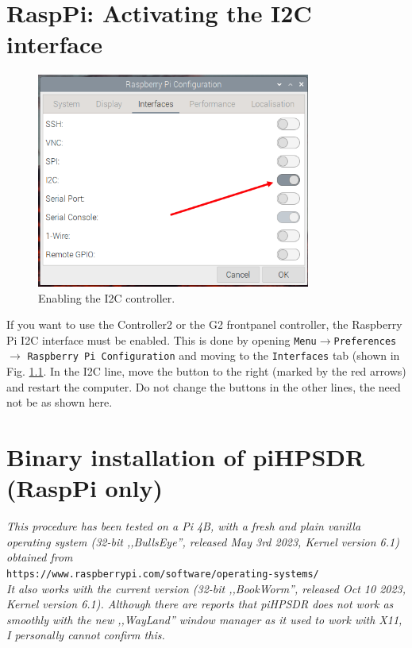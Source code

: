 \documentclass[12pt]{book}
\begin{document}
\chapter[RaspPi: Activating I2C]{RaspPi: Activating the I2C interface}
\label{sec:i2c}

\begin{figure}[ht]
\center
\includegraphics[width=9cm]{piEnableI2C.png}
\caption{Enabling the I2C controller.}
\label{fig:piEnableI2C}
\end{figure}

If you want to use the Controller2 or the G2 frontpanel controller, the Raspberry Pi I2C interface
must be enabled. This is done by opening \texttt{Menu}$\to$\texttt{Preferences}$\to$
\texttt{Raspberry Pi Configuration} and moving to the \texttt{Interfaces} tab
(shown in Fig. \ref{fig:piEnableI2C}. In the I2C line, move the button to the right
(marked by the red arrows) and restart the computer.
Do not change the buttons in the other lines, the need not be as shown here.



\chapter[RaspPi: binary piHPDSR installation]{Binary installation of piHPSDR (RaspPi only)}
\label{sec:installbinary}

\textit{This procedure has been tested on a Pi 4B, with a fresh and plain vanilla operating
system (32-bit ,,BullsEye'', released May 3rd 2023, Kernel version 6.1) obtained from} \\
\texttt{https://www.raspberrypi.com/software/operating-systems/} \\
\textit{It also works with the current
version (32-bit ,,BookWorm'', released Oct 10 2023, Kernel version 6.1). Although there are reports
that piHPSDR does not work as smoothly with the new ,,WayLand'' window manager as it used to work
with X11,
I personally cannot confirm this.}
\end{document}
